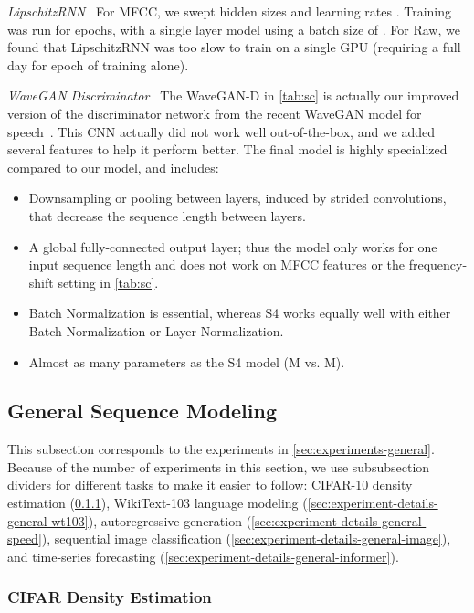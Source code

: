 \documentclass{article}
\newcommand{\methodabbrv}{S4}
\begin{document}
\textit{LipschitzRNN~\citep{erichson2021lipschitz}} For MFCC, we swept hidden sizes  and learning rates . Training was run for  epochs, with a single layer model using a batch size of . For Raw, we found that LipschitzRNN was too slow to train on a single GPU (requiring a full day for  epoch of training alone).

\textit{WaveGAN Discriminator~\citep{Donahue2019AdversarialAS}}
The WaveGAN-D in \cref{tab:sc} is actually our improved version of the discriminator network from the recent WaveGAN model for speech~\citep{Donahue2019AdversarialAS}.
This CNN actually did not work well out-of-the-box, and we added several features to help it perform better.
The final model is highly specialized compared to our model, and includes:
\begin{itemize}\item Downsampling or pooling between layers, induced by strided convolutions, that decrease the sequence length between layers.
  \item A global fully-connected output layer; thus the model only works for one input sequence length and does not work on MFCC features or the frequency-shift setting in \cref{tab:sc}.
  \item Batch Normalization is essential, whereas \methodabbrv{} works equally well with either Batch Normalization or Layer Normalization.
  \item Almost  as many parameters as the \methodabbrv{} model (M vs. M).
\end{itemize}

\subsection{General Sequence Modeling}
\label{sec:experiment-details-general}

This subsection corresponds to the experiments in \cref{sec:experiments-general}.
Because of the number of experiments in this section,
we use subsubsection dividers for different tasks to make it easier to follow:
CIFAR-10 density estimation (\cref{sec:experiment-details-general-cifargen}),
WikiText-103 language modeling (\cref{sec:experiment-details-general-wt103}),
autoregressive generation (\cref{sec:experiment-details-general-speed}),
sequential image classification (\cref{sec:experiment-details-general-image}),
and time-series forecasting (\cref{sec:experiment-details-general-informer}).

\subsubsection{CIFAR Density Estimation}
\label{sec:experiment-details-general-cifargen}
\end{document}
